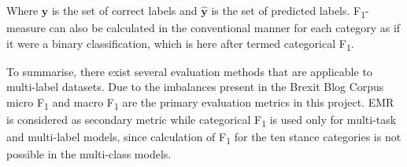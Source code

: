 \documentclass[Dissertation.tex]{subfiles}
\begin{document}
Where $ \mathbf{y} $ is the set of correct labels and $ \mathbf{\hat{y}} $ is the set of predicted labels. F\textsubscript{1}-measure can also be calculated in the conventional manner for each category as if it were a binary classification, which is here after termed categorical F\textsubscript{1}.


To summarise, there exist several evaluation methods that are applicable to multi-label datasets. Due to the imbalances present in the Brexit Blog Corpus micro F\textsubscript{1} and macro F\textsubscript{1} are the primary evaluation metrics in this project. EMR is considered as secondary metric while categorical F\textsubscript{1} is used only for multi-task and multi-label models, since calculation of F\textsubscript{1} for the ten stance categories is not possible in the multi-class models. 
\end{document}
